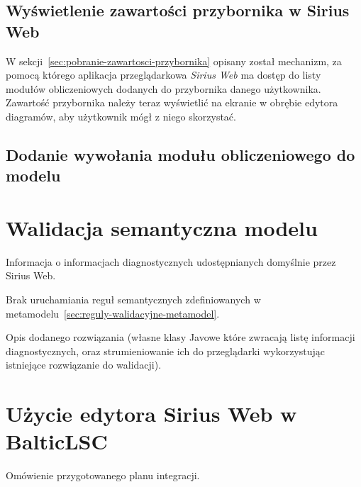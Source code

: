 \subsection{Wyświetlenie zawartości przybornika w Sirius Web}

W sekcji~\ref{sec:pobranie-zawartosci-przybornika} opisany został mechanizm, za
pomocą którego aplikacja przeglądarkowa \emph{Sirius Web} ma dostęp do listy
modułów obliczeniowych dodanych do przybornika danego użytkownika. Zawartość
przybornika należy teraz wyświetlić na ekranie w obrębie edytora diagramów, aby
użytkownik mógł z niego skorzystać.

\subsection{Dodanie wywołania modułu obliczeniowego do modelu}

%
%

\section{Walidacja semantyczna modelu}

Informacja o informacjach diagnostycznych udostępnianych domyślnie przez Sirius
Web.

Brak uruchamiania reguł semantycznych zdefiniowanych w
metamodelu~\ref{sec:reguly-walidacyjne-metamodel}.

Opis dodanego rozwiązania (własne klasy Javowe które zwracają listę informacji
diagnostycznych, oraz strumieniowanie ich do przeglądarki wykorzystując
istniejące rozwiązanie do walidacji).

\section{Użycie edytora Sirius Web w
  BalticLSC}\label{sec:uzycie-sirius-web-w-balcitlsc}

Omówienie przygotowanego planu integracji.
